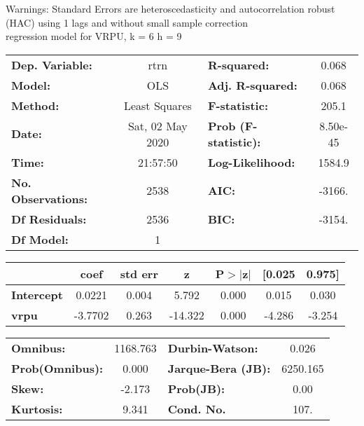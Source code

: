 Warnings: \newline
 [1] Standard Errors are heteroscedasticity and autocorrelation robust (HAC) using 1 lags and without small sample correction\\ 

regression model for VRPU, k = 6 h = 9\begin{center}
\begin{tabular}{lclc}
\toprule
\textbf{Dep. Variable:}    &       rtrn       & \textbf{  R-squared:         } &     0.068   \\
\textbf{Model:}            &       OLS        & \textbf{  Adj. R-squared:    } &     0.068   \\
\textbf{Method:}           &  Least Squares   & \textbf{  F-statistic:       } &     205.1   \\
\textbf{Date:}             & Sat, 02 May 2020 & \textbf{  Prob (F-statistic):} &  8.50e-45   \\
\textbf{Time:}             &     21:57:50     & \textbf{  Log-Likelihood:    } &    1584.9   \\
\textbf{No. Observations:} &        2538      & \textbf{  AIC:               } &    -3166.   \\
\textbf{Df Residuals:}     &        2536      & \textbf{  BIC:               } &    -3154.   \\
\textbf{Df Model:}         &           1      & \textbf{                     } &             \\
\bottomrule
\end{tabular}
\begin{tabular}{lcccccc}
                   & \textbf{coef} & \textbf{std err} & \textbf{z} & \textbf{P$> |$z$|$} & \textbf{[0.025} & \textbf{0.975]}  \\
\midrule
\textbf{Intercept} &       0.0221  &        0.004     &     5.792  &         0.000        &        0.015    &        0.030     \\
\textbf{vrpu}      &      -3.7702  &        0.263     &   -14.322  &         0.000        &       -4.286    &       -3.254     \\
\bottomrule
\end{tabular}
\begin{tabular}{lclc}
\textbf{Omnibus:}       & 1168.763 & \textbf{  Durbin-Watson:     } &    0.026  \\
\textbf{Prob(Omnibus):} &   0.000  & \textbf{  Jarque-Bera (JB):  } & 6250.165  \\
\textbf{Skew:}          &  -2.173  & \textbf{  Prob(JB):          } &     0.00  \\
\textbf{Kurtosis:}      &   9.341  & \textbf{  Cond. No.          } &     107.  \\
\bottomrule
\end{tabular}
\end{center}

